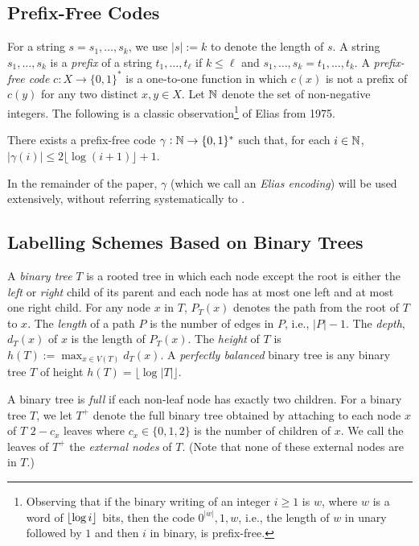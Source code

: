 \documentclass[10pt, conference, compsocconf]{IEEEtran}
\newcommand{\Oh}{\mathcal{O}}
\let\le\leqslant
\let\ge\geqslant
\begin{document}
\subsection{Prefix-Free Codes}

For a string $s=s_1,\dots,s_k$, we use $|s|:=k$ to denote the length of $s$.
A string $s_1,\dots,s_k$ is a \emph{prefix} of a string $t_1,\dots,t_\ell$ if $k\le \ell$ and $s_1,\dots,s_k=t_1,\dots,t_k$.  A \emph{prefix-free code} $c:X\to\{0,1\}^*$ is a one-to-one function in which $c(x)$ is not a prefix of $c(y)$ for any two distinct $x,y\in X$.  Let $\mathbb{N}$ denote the set of non-negative integers.  The following is a classic observation\footnote{Observing that if the binary writing of an integer $i\ge 1$ is $w$, where $w$ is a word of ${\lfloor \log{i} \rfloor}$ bits, then the code $0^{|w|},1,w$, i.e., the length of $w$ in unary followed by $1$ and then $i$ in binary, is prefix-free.} of Elias from 1975.

\begin{lem}
  There exists a prefix-free code $\gamma:\mathbb{N}\to\{0,1\}^*$ such that, for each $i\in\mathbb{N}$, $|\gamma(i)|\le 2\lfloor\log(i+1)\rfloor + 1$.%
  \end{lem}

  In the remainder of the paper, $\gamma$ (which we call an \emph{Elias encoding}) will be used extensively, without referring systematically to .

\subsection{Labelling Schemes Based on Binary Trees}

A \emph{binary tree} $T$ is a rooted tree in which each node except the root is either the \emph{left} or \emph{right} child of its parent and each node has at most one left and at most one right child.  For any node $x$ in $T$, $P_T(x)$ denotes the path from the root of $T$ to $x$.  The \emph{length} of a path $P$ is the number of edges in $P$, i.e., $|P|-1$.  The \emph{depth}, $d_T(x)$ of $x$ is the length of $P_T(x)$.  The \emph{height} of $T$ is $h(T):=\max_{x\in V(T)} d_T(x)$.  A \emph{perfectly balanced} binary tree is any binary tree $T$ of height $h(T)=\lfloor\log|T|\rfloor$.

A binary tree is \emph{full} if each non-leaf node has exactly two children. For a binary tree $T$, we let $T^+$ denote the full binary tree obtained by attaching to each node $x$ of $T$ $2-c_x$ leaves where $c_x \in\{0,1,2\}$ is the number of children of $x$.  We call the leaves of $T^+$ the \emph{external nodes} of $T$.  (Note that none of these external nodes are in $T$.)
\end{document}

